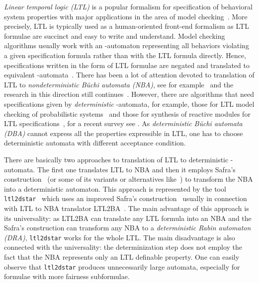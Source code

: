 \documentclass{llncs}
\begin{document}
\emph{Linear temporal logic (LTL)} is a popular formalism for specification
of behavioral system properties with major applications in the area of model
checking~\cite{CGP99,BK08}. More precisely, LTL is typically used as a
human-oriented front-end formalism as LTL formulae are succinct and easy to
write and understand. Model checking algorithms usually work with an
-automaton representing all behaviors violating a given
specification formula rather than with the LTL formula directly. Hence,
specifications written in the form of LTL formulae are negated and
translated to equivalent -automata~\cite{VardiW86}. There has been a
lot of attention devoted to translation of LTL to \emph{nondeterministic
  B\"uchi automata (NBA)}, see for example~\cite{Cou99,DGV99,SB00,GO01} and
the research in this direction still continues~\cite{DL11,BKRS12,BBDL13}.  However,
there are algorithms that need specifications given by \emph{deterministic}
-automata, for example, those for LTL model checking of
probabilistic systems~\cite{Vardi85,CY95,BK08} and those for synthesis of
reactive modules for LTL specifications~\cite{Church62,PnueliR89}, for a
recent survey see \cite{Kupferman12}.
As \emph{deterministic B\"uchi automata (DBA)} cannot express all the
properties expressible in LTL, one has to choose deterministic automata with
different acceptance condition.


There are basically two approaches to translation of LTL to
deterministic -automata. The first one translates LTL to NBA
and then it employs Safra's construction~\cite{Saf88} (or some of its
variants or alternatives like~\cite{Pit07,Sch09}) to transform the NBA into
a deterministic automaton. This approach is represented by the
tool \texttt{ltl2dstar}~\cite{Kle} which uses an improved Safra's
construction~\cite{KB06,KB07} usually in connection with LTL to NBA
translator LTL2BA~\cite{GO01}. The main advantage of this approach is its
universality: as LTL2BA can translate any LTL formula into an NBA and the
Safra's construction can transform any NBA to a \emph{deterministic Rabin
  automaton (DRA)}, \texttt{ltl2dstar} works for the whole LTL. The main
disadvantage is also connected with the universality: the determinization
step does not employ the fact that the NBA represents only an LTL definable
property. One can easily observe that \texttt{ltl2dstar} produces
unnecessarily large automata, especially for formulae with more fairness
subformulae.
\end{document}
